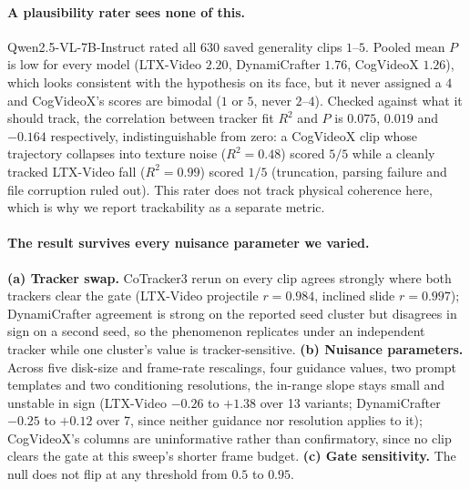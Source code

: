 \documentclass[10pt,twocolumn,letterpaper]{article}
\begin{document}
\paragraph{A plausibility rater sees none of this.}
Qwen2.5-VL-7B-Instruct \citep{qwen25vl} rated all $630$ saved generality clips
$1$--$5$. Pooled mean $P$ is low for every model (LTX-Video $2.20$,
DynamiCrafter $1.76$, CogVideoX $1.26$), which looks consistent with the
hypothesis on its face, but it never assigned a $4$ and CogVideoX's scores
are bimodal ($1$ or $5$, never $2$--$4$). Checked against what it should
track, the correlation between tracker fit $R^2$ and $P$ is $0.075$,
$0.019$ and $-0.164$ respectively, indistinguishable from zero: a
CogVideoX clip whose trajectory collapses into texture noise ($R^2=0.48$)
scored $5/5$ while a cleanly tracked LTX-Video fall ($R^2=0.99$) scored
$1/5$ (truncation, parsing failure and file corruption ruled out). This
rater does not track physical coherence here, which is why we report
trackability as a separate metric.

\paragraph{The result survives every nuisance parameter we varied.}
\textbf{(a) Tracker swap.} CoTracker3 \citep{karaev2023cotracker} rerun on
every clip agrees strongly where both trackers clear the gate (LTX-Video
projectile $r=0.984$, inclined slide $r=0.997$); DynamiCrafter agreement
is strong on the reported seed cluster but disagrees in sign on a second
seed, so the phenomenon replicates under an independent tracker while one
cluster's value is tracker-sensitive. \textbf{(b) Nuisance parameters.}
Across five disk-size and frame-rate rescalings, four guidance values, two
prompt templates and two conditioning resolutions, the in-range slope
stays small and unstable in sign (LTX-Video $-0.26$ to $+1.38$ over 13
variants; DynamiCrafter $-0.25$ to $+0.12$ over 7, since neither guidance
nor resolution applies to it); CogVideoX's columns
are uninformative rather than confirmatory, since no clip clears the gate
at this sweep's shorter frame budget. \textbf{(c) Gate sensitivity.} The
null does not flip at any threshold from $0.5$ to $0.95$.
\end{document}
